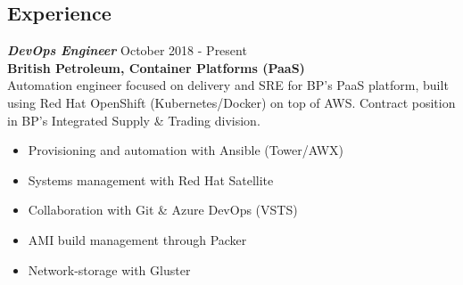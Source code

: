\documentclass[margin, 10pt]{res} %
\begin{document}
 \begin{resume}
 
\section{Experience}

{\sl \textbf{DevOps Engineer}} \hfill October 2018 - Present \\
\textbf{British Petroleum, Container Platforms (PaaS)}\\
Automation engineer focused on delivery and SRE for BP's PaaS platform, built using Red Hat OpenShift (Kubernetes/Docker) on top of AWS. Contract position in BP's Integrated Supply \& Trading division.
\begin{itemize}
\item Provisioning and automation with Ansible (Tower/AWX)
\item Systems management with Red Hat Satellite
\item Collaboration with Git \& Azure DevOps (VSTS)
\item AMI build management through Packer
\item Network-storage with Gluster
\end{itemize} 


\end{resume}
\end{document}

